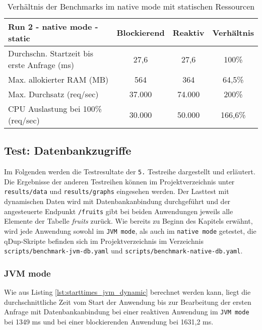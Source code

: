 \begin{table}[ht!]
    \begin{tabular}{|l | c | c | c|}
        \hline
        Run 2 - native mode - static & Blockierend & Reaktiv & Verhältnis \\
        \hline
        \makecell[l]{Durchschn. Startzeit bis                             \\erste Anfrage (ms)} &   27,6    &  27,6  &   100\%   \\
        \hline
        Max. allokierter RAM (MB)    & 564         & 364     & 64,5\%     \\
        \hline
        Max. Durchsatz (req/sec)     & 37.000      & 74.000  & 200\%      \\
        \hline
        \makecell[l]{CPU Auslastung bei 100\%                             \\ (req/sec)} & 30.000 & 50.000 & 166,6\%  \\
        \hline
    \end{tabular}
    \caption{Verhältnis der Benchmarks im native mode mit statischen Ressourcen}
    \label{table:static_native_measurement_results}
\end{table}
\newpage
\subsection{Test: Datenbankzugriffe}
\label{section:datenbankzugriffe}
Im Folgenden werden die Testresultate der \verb|5.| Testreihe dargestellt und erläutert.
Die Ergebnisse der anderen Testreihen können im Projektverzeichnis unter \verb|results/data| und \verb|results/graphs| eingesehen werden.
Der Lasttest mit dynamischen Daten wird mit Datenbankanbindung durchgeführt und der angesteuerte Endpunkt \verb|/fruits| gibt bei beiden Anwendungen
jeweils alle Elemente der Tabelle \textit{fruits} zurück. Wie bereits zu Beginn des Kapitels erwähnt, wird jede Anwendung sowohl im \verb|JVM mode|, als auch im
\verb|native mode| getestet, die qDup-Skripte befinden sich im Projektverzeichnis im Verzeichnis \verb|scripts/benchmark-jvm-db.yaml| und
\verb|scripts/benchmark-native-db.yaml|.

\subsubsection{JVM mode}
\label{subsubsec:dynamic_jvm_mode}
Wie aus Listing \ref{lst:starttimes_jvm_dynamic} berechnet werden kann, liegt die durchschnittliche Zeit vom Start der Anwendung bis zur
Bearbeitung der ersten Anfrage mit Datenbankanbindung bei einer reaktiven Anwendung im \verb|JVM mode| bei 1349 ms und bei einer
blockierenden Anwendung bei 1631,2 ms.

